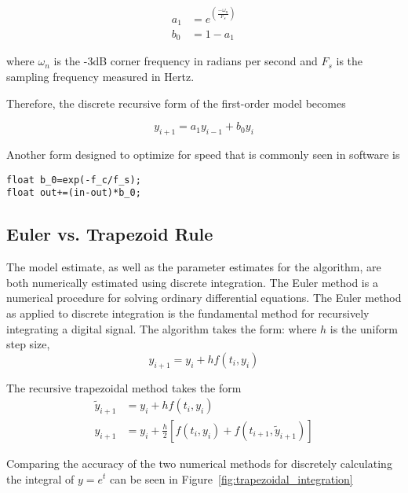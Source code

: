 \begin{equation}\label{eq:first_order_coeffieicnts}
\begin{split}
 a_1&=e^{\left(\frac{-\omega_n}{F_s}\right)}  \\
 b_0&=1-a_1
\end{split}
\end{equation}

where $\omega_n$ is the -3dB corner frequency in radians per second and $F_s$ is the sampling frequency measured in Hertz.

Therefore, the discrete recursive form of the first-order model becomes

\begin{equation}
y_{i+1}=a_1y_{i-1}+b_0y_i
\end{equation}

Another form designed to optimize for speed that is commonly seen in software is

\begin{lstlisting}
float b_0=exp(-f_c/f_s);
float out+=(in-out)*b_0;
\end{lstlisting}

\subsection{Euler vs. Trapezoid Rule}

The model estimate, as well as the parameter estimates for the \Lone algorithm, are both numerically estimated using discrete integration.  The Euler method is a numerical procedure for solving ordinary differential equations. The Euler method as applied to discrete integration is the fundamental method for recursively integrating a digital signal.  The algorithm takes the form: \newline
where $h$ is the uniform step size,
\begin{equation}
y_{i+1}=y_i+hf(t_i,y_i)
\end{equation}

The recursive trapezoidal method takes the form
\begin{equation}\label{eq:trapezoidal_integration}
\begin{split}
\tilde{y}_{i+1}&=y_i+hf(t_i,y_i) \\
y_{i+1}&=y_i+\frac{h}{2}[f(t_i,y_i)+f(t_{i+1},\tilde{y}_{i+1})]
\end{split}
\end{equation}

Comparing the accuracy of the two numerical methods for discretely calculating the integral of $y=e^t$ can be seen in Figure~\ref{fig:trapezoidal_integration}

